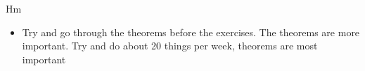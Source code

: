 \documentclass{fkbook}
\begin{document}
Hm
\begin{itemize}
  \item Try and go through the theorems before the exercises. The theorems are
    more important. Try and do about 20 things per week, theorems are most
    important

\end{itemize}
\mainmatter
\pagestyle{main}



\end{document}
